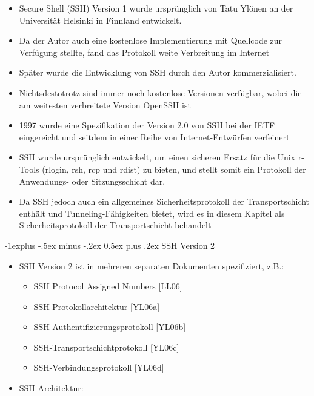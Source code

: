 \documentclass[a4paper]{article}
\makeatletter
\renewcommand{\subsection}{\@startsection{subsection}{2}{0mm}%
 {-1explus -.5ex minus -.2ex}%
 {0.5ex plus .2ex}%
 {\normalfont\normalsize\bfseries}}
\makeatother
\begin{document}
\begin{multicols}{3}
    \begin{itemize}
        \item
              Secure Shell (SSH) Version 1 wurde ursprünglich von Tatu Ylönen an der
              Universität Helsinki in Finnland entwickelt.
        \item
              Da der Autor auch eine kostenlose Implementierung mit Quellcode zur
              Verfügung stellte, fand das Protokoll weite Verbreitung im Internet
        \item
              Später wurde die Entwicklung von SSH durch den Autor kommerzialisiert.
        \item
              Nichtsdestotrotz sind immer noch kostenlose Versionen verfügbar, wobei
              die am weitesten verbreitete Version OpenSSH ist
        \item
              1997 wurde eine Spezifikation der Version 2.0 von SSH bei der IETF
              eingereicht und seitdem in einer Reihe von Internet-Entwürfen
              verfeinert
        \item
              SSH wurde ursprünglich entwickelt, um einen sicheren Ersatz für die
              Unix r-Tools (rlogin, rsh, rcp und rdist) zu bieten, und stellt somit
              ein Protokoll der Anwendungs- oder Sitzungsschicht dar.
        \item
              Da SSH jedoch auch ein allgemeines Sicherheitsprotokoll der
              Transportschicht enthält und Tunneling-Fähigkeiten bietet, wird es in
              diesem Kapitel als Sicherheitsprotokoll der Transportschicht behandelt
    \end{itemize}


    \subsection{SSH Version 2}

    \begin{itemize}
        \item
              SSH Version 2 ist in mehreren separaten Dokumenten spezifiziert, z.B.:

              \begin{itemize}
                  \item
                        SSH Protocol Assigned Numbers {[}LL06{]}
                  \item
                        SSH-Protokollarchitektur {[}YL06a{]}
                  \item
                        SSH-Authentifizierungsprotokoll {[}YL06b{]}
                  \item
                        SSH-Transportschichtprotokoll {[}YL06c{]}
                  \item
                        SSH-Verbindungsprotokoll {[}YL06d{]}
              \end{itemize}
        \item
              SSH-Architektur:


\end{itemize}
\end{multicols}
\end{document}
